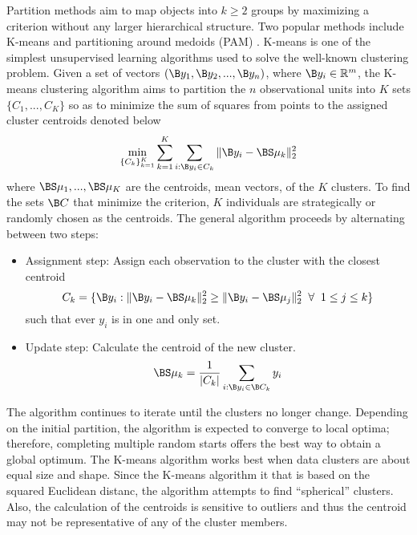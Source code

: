 Partition methods aim to map objects into $k\geq 2$ groups by maximizing a criterion without any larger hierarchical structure. Two popular methods include K-means \cite{macqueen1967} and partitioning around medoids (PAM) \cite{kaufman1990}. K-means is one of the simplest unsupervised learning algorithms used to solve the well-known clustering problem. Given a set of vectors $(\B y_{1},\B y_{2},...,\B y_{n})$, where $\B y_{i}\in\mathbb{R}^{m}$, the K-means clustering algorithm aims to partition the $n$ observational units into $K$ sets $\{C_{1},...,C_{K}\}$ so as to minimize the sum of squares from points to the assigned cluster centroids denoted below
$$\min_{\{C_{k}\}_{k=1}^{K}}\sum_{k=1}^{K}\sum_{i: \B y_{i}\in C_{k}}\|\B y_{i} -\BS \mu_{k}\|_{2}^{2}$$
where $\BS\mu_{1},...,\BS\mu_{K}$ are the centroids, mean vectors, of the $K$ clusters. To find the sets $\B C$ that minimize the criterion, $K$ individuals are strategically or randomly chosen as the centroids. The general algorithm proceeds by alternating between two steps:
\begin{itemize}
\item Assignment step: Assign each observation to the cluster with the closest centroid
$$ C_{k} = \{\B y_{i}: \|\B y_{i} - \BS\mu_{k}\|_{2}^{2}\geq \|\B y_{i} - \BS\mu_{j}\|_{2}^{2} \;\;\forall\;\; 1\leq j\leq k\}$$
such that ever $y_{i}$ is in one and only set.
\item Update step: Calculate the centroid of the new cluster.
$$\BS\mu_{k} = \frac{1}{|C_{k}|}\sum_{i: \B y_{i}\in\B C_{k}} y_{i}$$
\end{itemize}
The algorithm continues to iterate until the clusters no longer change. Depending on the initial partition, the algorithm is expected to converge to local optima; therefore, completing multiple random starts offers the best way to obtain a global optimum. The K-means algorithm works best when data clusters are about equal size and shape. Since the K-means algorithm it that is based on the squared Euclidean distanc, the algorithm attempts to find ``spherical'' clusters. Also, the calculation of the centroids is sensitive to outliers and thus the centroid may not be representative of any of the cluster members.


